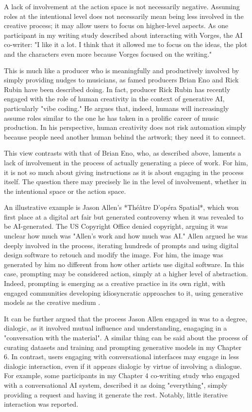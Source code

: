 A lack of involvement at the action space is not necessarily negative. Assuming roles at the intentional level does not necessarily mean being less involved in the creative process; it may allow users to focus on higher-level aspects. As one participant in my writing study described about interacting with Vorges, the AI co-writer: "I like it a lot. I think that it allowed me to focus on the ideas, the plot and the characters even more because Vorges focused on the writing."

This is much like a producer who is meaningfully and productively involved by simply providing nudges to musicians, as famed producers Brian Eno and Rick Rubin have been described doing. In fact, producer Rick Rubin has recently engaged with the role of human creativity in the context of generative AI, particularly "vibe coding." He argues that, indeed, humans will increasingly assume roles similar to the one he has taken in a prolific career of music production. In his perspective, human creativity does not risk automation simply because people need another human behind the artwork; they need it to connect.

This view contrasts with that of Brian Eno, who, as described above, laments a lack of involvement in the process of actually generating a piece of work. For him, it is not so much about giving instructions as it is about engaging in the process itself. The question there may precisely lie in the level of involvement, whether in the intentional space or the action space.

An illustrative example is Jason Allen's *Théâtre D'opéra Spatial*, which won first place at a digital art fair but generated controversy when it was revealed to be AI-generated. The US Copyright Office denied copyright, arguing it was unclear how much was "Allen's work and how much was AI." Allen argued he was deeply involved in the process, iterating hundreds of prompts and using digital design software to retouch and modify the image. For him, the image was generated by him no different from how other artists use digital software. In this case, prompting may be considered action, simply at a higher level of abstraction.  Indeed, prompting is emerging as a creative practice in its own right, with engaged communities developing idiosyncratic approaches to it, using generative models as the creative medium \cite{Chang2023-tv, Smith2022-dm}.

It can be further argued that the process Jason Allen engaged in was to a degree, dialogic, as it involved mutual influence and understanding, enagaging in a "conversation with the material". A similar thing can be said about the process of curating datasets and training and prompting generative models in my Chapter 6. In contrast, users engaging with conversational interfaces may engage in less dialogic interaction, even if it appears dialogic by virtue of involving a dialogue. For example, some participants in my Chapter 4 co-writing study who engaged with a conversational AI system, described it as doing "everything", simply providing a request and having it generate the rest. Notably, little iterative interaction was reported. 

